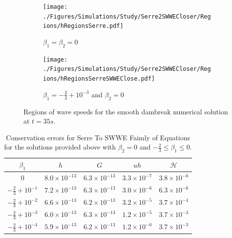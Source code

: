 \documentclass[10pt]{article}
\newcommand\T{\rule{0pt}{5ex }}       %
\begin{document}
\begin{figure}
	\centering
	\begin{subfigure}{0.49\textwidth}
		\centering
		\texttt{[image: ./Figures/Simulations/Study/Serre2SWWECloser/Regions/hRegionsSerre.pdf]}
		\caption{$\beta_1 = \beta_2 = 0$}
	\end{subfigure}
	\begin{subfigure}{0.49\textwidth}
		\centering
		\texttt{[image: ./Figures/Simulations/Study/Serre2SWWECloser/Regions/hRegionsSerreSWWEClose.pdf]}
		\caption{$\beta_1 = -\frac{2}{3} + 10^{-3}$ and  $\beta_2 = 0$}
	\end{subfigure}
	\caption{Regions of wave speeds for the smooth dambreak numerical solution at $t=35s$.}
\end{figure}


\begin{table}
	\centering
	\begin{tabular}{ c | c | c | c | c }
		$\beta_1$ & $h$ & $G$ & $uh$ & $\mathcal{H}$  \\
		\hline
		\T $0$ &	$8.0 \times 10^{-13}$ &	$6.3 \times 10^{-13}$ & $3.3 \times 10^{-7}$ & $3.8 \times 10^{-6}$ \\
		\T $-\frac{2}{3} + 10^{-1}$ &	$7.2 \times 10^{-13}$ &	$6.3 \times 10^{-13}$ & $3.0 \times 10^{-6}$ & $6.3 \times 10^{-6}$ \\
		\T $-\frac{2}{3} + 10^{-2}$ &	$6.6 \times 10^{-13}$ &	$6.2 \times 10^{-13}$ & $3.2 \times 10^{-5}$ & $3.7 \times 10^{-4}$ \\		
		\T $-\frac{2}{3} + 10^{-3}$ &	$6.0 \times 10^{-13}$ &	$6.3 \times 10^{-13}$ & $1.2 \times 10^{-5}$ & $3.7 \times 10^{-3}$ \\	
		\T $-\frac{2}{3} + 10^{-4}$ &	$5.9 \times 10^{-13}$ &	$6.2 \times 10^{-13}$ & $1.2 \times 10^{-6}$ & $3.7 \times 10^{-3}$ 		
	\end{tabular}
	\caption{Conservation errors for Serre To SWWE Faimly of Equations for the solutions provided above with $\beta_2 = 0$ and $-\frac{2}{3}\le \beta_1 \le 0$.}
\end{table}
\end{document}
